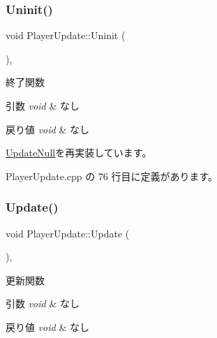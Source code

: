 \subsubsection{\texorpdfstring{Uninit()}{Uninit()}}
{\footnotesize\ttfamily void Player\+Update\+::\+Uninit (\begin{DoxyParamCaption}{ }\end{DoxyParamCaption})\hspace{0.3cm}{\ttfamily [override]}, {\ttfamily [virtual]}}



終了関数 


\begin{DoxyParams}{引数}
{\em void} & なし \\
\hline
\end{DoxyParams}

\begin{DoxyRetVals}{戻り値}
{\em void} & なし \\
\hline
\end{DoxyRetVals}


\mbox{\hyperlink{class_update_null_a5bd107431c5039abe13c966edb047375}{Update\+Null}}を再実装しています。



 Player\+Update.\+cpp の 76 行目に定義があります。

\mbox{\label{class_player_update_af6e1b8ca60399f232e64d2acb4968c75}} 
\subsubsection{\texorpdfstring{Update()}{Update()}}
{\footnotesize\ttfamily void Player\+Update\+::\+Update (\begin{DoxyParamCaption}{ }\end{DoxyParamCaption})\hspace{0.3cm}{\ttfamily [override]}, {\ttfamily [virtual]}}



更新関数 


\begin{DoxyParams}{引数}
{\em void} & なし \\
\hline
\end{DoxyParams}

\begin{DoxyRetVals}{戻り値}
{\em void} & なし \\
\hline
\end{DoxyRetVals}



